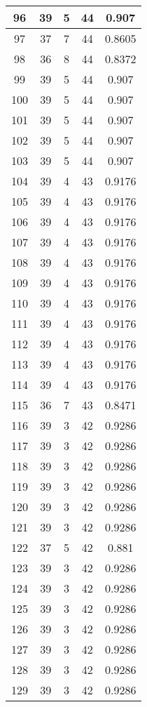 \documentclass[letterpaper, 12pt]{article}
\begin{document}
\begin{longtable}{|c|c|c|c|c|}
\hline
96 & 39 & 5 & 44 & 0.907 \\
\hline
97 & 37 & 7 & 44 & 0.8605 \\
\hline
98 & 36 & 8 & 44 & 0.8372 \\
\hline
99 & 39 & 5 & 44 & 0.907 \\
\hline
100 & 39 & 5 & 44 & 0.907 \\
\hline
101 & 39 & 5 & 44 & 0.907 \\
\hline
102 & 39 & 5 & 44 & 0.907 \\
\hline
103 & 39 & 5 & 44 & 0.907 \\
\hline
104 & 39 & 4 & 43 & 0.9176 \\
\hline
105 & 39 & 4 & 43 & 0.9176 \\
\hline
106 & 39 & 4 & 43 & 0.9176 \\
\hline
107 & 39 & 4 & 43 & 0.9176 \\
\hline
108 & 39 & 4 & 43 & 0.9176 \\
\hline
109 & 39 & 4 & 43 & 0.9176 \\
\hline
110 & 39 & 4 & 43 & 0.9176 \\
\hline
111 & 39 & 4 & 43 & 0.9176 \\
\hline
112 & 39 & 4 & 43 & 0.9176 \\
\hline
113 & 39 & 4 & 43 & 0.9176 \\
\hline
114 & 39 & 4 & 43 & 0.9176 \\
\hline
115 & 36 & 7 & 43 & 0.8471 \\
\hline
116 & 39 & 3 & 42 & 0.9286 \\
\hline
117 & 39 & 3 & 42 & 0.9286 \\
\hline
118 & 39 & 3 & 42 & 0.9286 \\
\hline
119 & 39 & 3 & 42 & 0.9286 \\
\hline
120 & 39 & 3 & 42 & 0.9286 \\
\hline
121 & 39 & 3 & 42 & 0.9286 \\
\hline
122 & 37 & 5 & 42 & 0.881 \\
\hline
123 & 39 & 3 & 42 & 0.9286 \\
\hline
124 & 39 & 3 & 42 & 0.9286 \\
\hline
125 & 39 & 3 & 42 & 0.9286 \\
\hline
126 & 39 & 3 & 42 & 0.9286 \\
\hline
127 & 39 & 3 & 42 & 0.9286 \\
\hline
128 & 39 & 3 & 42 & 0.9286 \\
\hline
129 & 39 & 3 & 42 & 0.9286 \\

\end{longtable}
\end{document}
